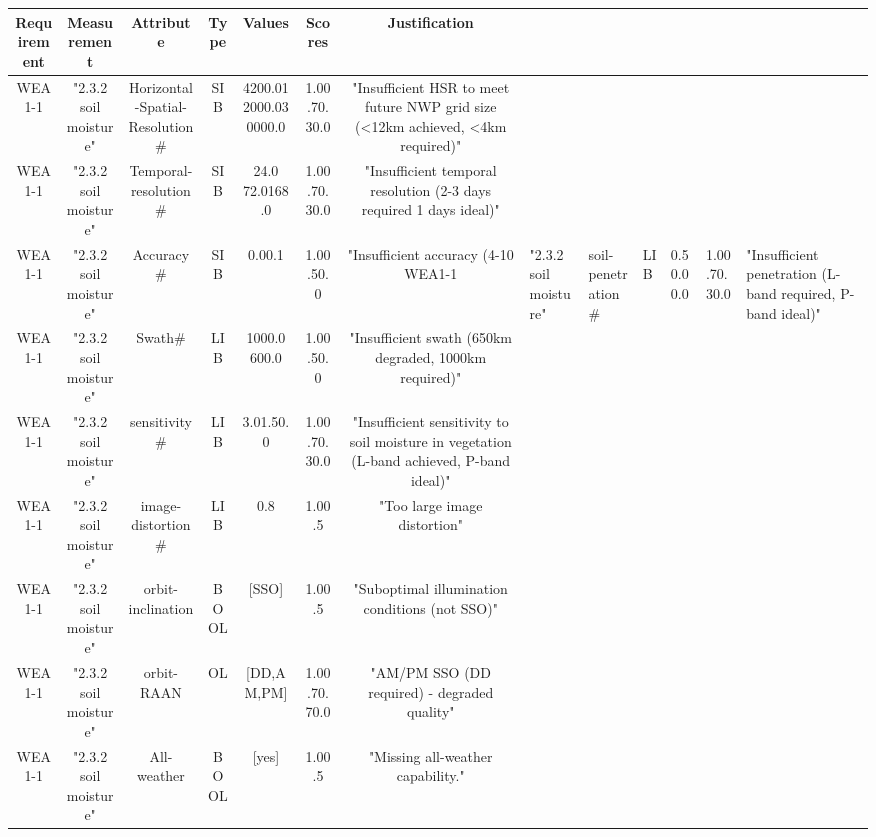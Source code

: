 \begin{tabular}{ccccccc}
\hline
 Requirement & Measurement & Attribute & Type & Values & Scores & Justification \\
\hline
WEA1-1 &"2.3.2 soil moisture" &Horizontal-Spatial-Resolution# &SIB &4200.012000.030000.0 &1.00.70.30.0 &"Insufficient HSR to meet future NWP grid size (<12km achieved, <4km required)"\\
WEA1-1 &"2.3.2 soil moisture" &Temporal-resolution# &SIB &24.0 72.0168.0 &1.00.70.30.0 &"Insufficient temporal resolution (2-3 days required 1 days ideal)"\\
WEA1-1 &"2.3.2 soil moisture" &Accuracy# &SIB &0.00.1 &1.00.50.0 &"Insufficient accuracy (4-10%
WEA1-1 &"2.3.2 soil moisture" &soil-penetration# &LIB &0.50.00.0 &1.00.70.30.0 &"Insufficient penetration (L-band required, P-band ideal)"\\
WEA1-1 &"2.3.2 soil moisture" &Swath# &LIB &1000.0 600.0 &1.00.50.0 &"Insufficient swath (650km degraded, 1000km required)"\\
WEA1-1 &"2.3.2 soil moisture" &sensitivity# &LIB &3.01.50.0 &1.00.70.30.0 &"Insufficient sensitivity to soil moisture in vegetation (L-band achieved, P-band ideal)"\\
WEA1-1 &"2.3.2 soil moisture" &image-distortion# &LIB &0.8 &1.00.5 &"Too large image distortion"\\
WEA1-1 &"2.3.2 soil moisture" &orbit-inclination &BOOL &[SSO] &1.00.5 &"Suboptimal illumination conditions (not SSO)"\\
WEA1-1 &"2.3.2 soil moisture" &orbit-RAAN &OL &[DD,AM,PM] &1.00.70.70.0 &"AM/PM SSO (DD required) - degraded quality"\\
WEA1-1 &"2.3.2 soil moisture" &All-weather &BOOL &[yes] &1.00.5 &"Missing all-weather capability."\\
\hline
\end{tabular}
